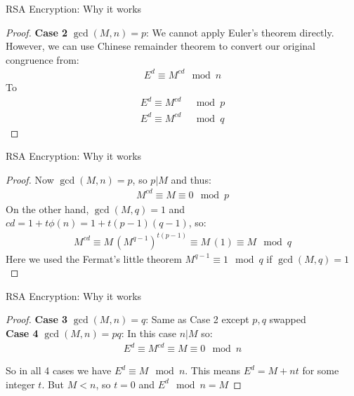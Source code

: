 \documentclass[10pt,xcolor={table,dvipsnames},t]{beamer}
\begin{document}
\begin{frame}{RSA Encryption: Why it works}
  \begin{proof} \textbf{Case 2} $\gcd(M,n)=p$: We cannot apply Euler's theorem directly. However, we can use Chinese remainder theorem to convert our original congruence from:
    \begin{align*}
      E^{d}\equiv M^{cd} \mod n
    \end{align*}
    To 
    \begin{align*}
      E^{d} \equiv M^{cd} &\mod p \\
      E^{d} \equiv M^{cd} &\mod q
    \end{align*}
    \phantom\qedhere
  \end{proof}
  
\end{frame}

\begin{frame}{RSA Encryption: Why it works}
  \begin{proof} 
    Now $\gcd(M,n)=p$, so $p|M$ and thus:
    \begin{align*}
      M^{cd} \equiv M \equiv 0 \mod p
    \end{align*}
    On the other hand, $\gcd(M,q)=1$ and $cd = 1+t\phi(n) = 1 + t(p-1)(q-1)$, so:
    \begin{align*}
      M^{cd} \equiv M\,\left(M^{q-1}\right)^{t(p-1)} \equiv M \,(1) \equiv M \mod q
    \end{align*}
    Here we used the Fermat's little theorem $M^{q-1} \equiv 1 \mod q$ if $\gcd(M,q)=1$
    \phantom\qedhere
  \end{proof}
  
\end{frame}


\begin{frame}{RSA Encryption: Why it works}
  \begin{proof} \textbf{Case 3} $\gcd(M,n)=q$: Same as Case 2 except $p,q$ swapped\\
    \textbf{Case 4} $\gcd(M,n)=pq$: In this case $n|M$ so:
    \begin{align*}
      E^{d} \equiv M^{cd} \equiv M \equiv 0 \mod n
    \end{align*}

    So in all 4 cases we have $E^d \equiv M \mod n$. This means $E^d = M + nt$ for some integer $t$. But $M < n$, so $t=0$ and $E^d \mod n = M$ 
  \end{proof}
\end{frame}
\end{document}
